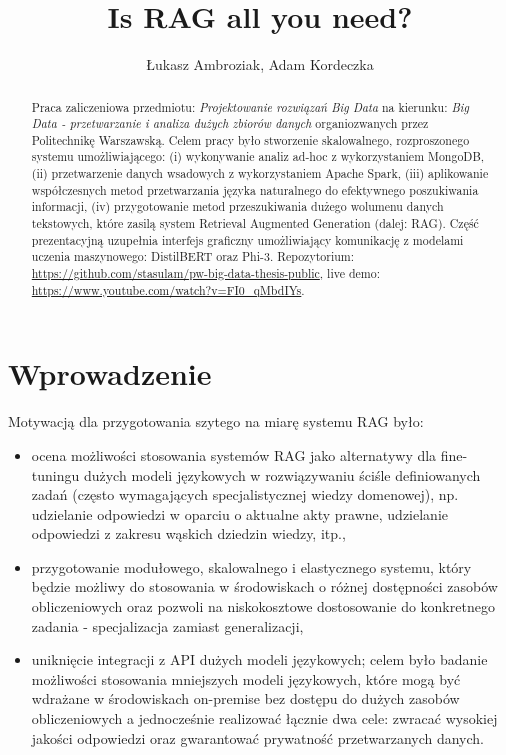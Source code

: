 \documentclass[10pt]{article}
\title{Is RAG all you need?}
\author{Łukasz Ambroziak, Adam Kordeczka}
\begin{document}
\maketitle

\begin{abstract}
  Praca zaliczeniowa przedmiotu: \emph{Projektowanie rozwiązań Big Data} na kierunku: \emph{Big Data - przetwarzanie i analiza dużych zbiorów danych} organiozwanych przez Politechnikę Warszawską. Celem pracy było stworzenie skalowalnego, rozproszonego systemu umożliwiającego: (i) wykonywanie analiz ad-hoc z wykorzystaniem MongoDB, (ii) przetwarzenie danych wsadowych z wykorzystaniem Apache Spark, (iii) aplikowanie współczesnych metod przetwarzania języka naturalnego do efektywnego poszukiwania informacji, (iv) przygotowanie metod przeszukiwania dużego wolumenu danych tekstowych, które zasilą system Retrieval Augmented Generation (dalej: RAG). Część prezentacyjną uzupełnia interfejs graficzny umożliwiający komunikację z modelami uczenia maszynowego: DistilBERT oraz Phi-3. Repozytorium: \url{https://github.com/stasulam/pw-big-data-thesis-public}, live demo: \url{https://www.youtube.com/watch?v=FI0_qMbdIYs}.
\end{abstract}

\tableofcontents

\section{Wprowadzenie}

Motywacją dla przygotowania szytego na miarę systemu RAG było:

\begin{itemize}
  \item ocena możliwości stosowania systemów RAG jako alternatywy dla fine-tuningu dużych modeli językowych w rozwiązywaniu ściśle definiowanych zadań (często wymagających specjalistycznej wiedzy domenowej), np. udzielanie odpowiedzi w oparciu o aktualne akty prawne, udzielanie odpowiedzi z zakresu wąskich dziedzin wiedzy, itp.,
  \item przygotowanie modułowego, skalowalnego i elastycznego systemu, który będzie możliwy do stosowania w środowiskach o różnej dostępności zasobów obliczeniowych oraz pozwoli na niskokosztowe dostosowanie do konkretnego zadania - specjalizacja zamiast generalizacji,
  \item uniknięcie integracji z API dużych modeli językowych; celem było badanie możliwości stosowania mniejszych modeli językowych, które mogą być wdrażane w środowiskach on-premise bez dostępu do dużych zasobów obliczeniowych a jednocześnie realizować łącznie dwa cele: zwracać wysokiej jakości odpowiedzi oraz gwarantować prywatność przetwarzanych danych.
\end{itemize}
\end{document}
